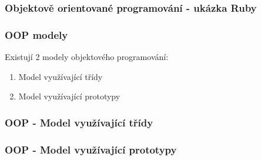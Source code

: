\begin{frame}
    \frametitle{Objektově orientované programování - ukázka Ruby}


\end{frame}

\begin{frame}
    \frametitle{OOP modely}
        Existují 2 modely objektového programování:
        \begin{enumerate}
            \item Model využívající třídy
            \item Model využívající prototypy
        \end{enumerate} 
\end{frame}

\begin{frame}
    \frametitle{OOP - Model využívající třídy}
    
\end{frame}

\begin{frame}
    \frametitle{OOP - Model využívající prototypy}
    
\end{frame}